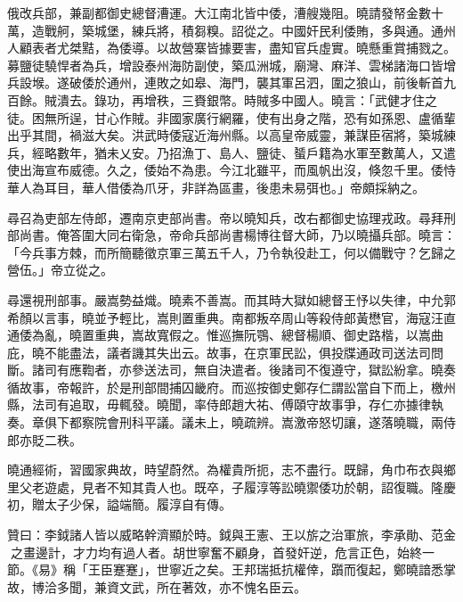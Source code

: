 \begin{pinyinscope}
俄改兵部，兼副都御史總督漕運。大江南北皆中倭，漕艘幾阻。曉請發帑金數十萬，造戰舸，築城堡，練兵將，積芻糗。詔從之。中國奸民利倭賄，多與通。通州人顧表者尤桀黠，為倭導。以故營寨皆據要害，盡知官兵虛實。曉懸重賞捕戮之。募鹽徒驍悍者為兵，增設泰州海防副使，築瓜洲城，廟灣、麻洋、雲梯諸海口皆增兵設堠。遂破倭於通州，連敗之如皋、海門，襲其軍呂泗，圍之狼山，前後斬首九百餘。賊潰去。錄功，再增秩，三賚銀幣。時賊多中國人。曉言：「武健才住之徒。困無所逞，甘心作賊。非國家廣行網羅，使有出身之階，恐有如孫恩、盧循輩出乎其間，禍滋大矣。洪武時倭寇近海州縣。以高皇帝威靈，兼謀臣宿將，築城練兵，經略數年，猶未乂安。乃招漁丁、島人、鹽徒、蜑戶籍為水軍至數萬人，又遣使出海宣布威德。久之，倭始不為患。今江北雖平，而風帆出沒，倏忽千里。倭恃華人為耳目，華人借倭為爪牙，非詳為區畫，後患未易弭也。」帝頗採納之。

尋召為吏部左侍郎，遷南京吏部尚書。帝以曉知兵，改右都御史協理戎政。尋拜刑部尚書。俺答圍大同右衛急，帝命兵部尚書楊博往督大師，乃以曉攝兵部。曉言：「今兵事方棘，而所簡聽徵京軍三萬五千人，乃令執役赴工，何以備戰守？乞歸之營伍。」帝立從之。

尋還視刑部事。嚴嵩勢益熾。曉素不善嵩。而其時大獄如總督王忬以失律，中允郭希顏以言事，曉並予輕比，嵩則置重典。南都叛卒周山等殺侍郎黃懋官，海寇汪直通倭為亂，曉置重典，嵩故寬假之。惟巡撫阮鶚、總督楊順、御史路楷，以嵩曲庇，曉不能盡法，議者譏其失出云。故事，在京軍民訟，俱投牒通政司送法司問斷。諸司有應鞫者，亦參送法司，無自決遣者。後諸司不復遵守，獄訟紛拿。曉奏循故事，帝報許，於是刑部間捕囚畿府。而巡按御史鄭存仁謂訟當自下而上，檄州縣，法司有追取，毋輒發。曉聞，率侍郎趙大祐、傅頤守故事爭，存仁亦據律執奏。章俱下都察院會刑科平議。議未上，曉疏辨。嵩激帝怒切讓，遂落曉職，兩侍郎亦貶二秩。

曉通經術，習國家典故，時望蔚然。為權貴所扼，志不盡行。既歸，角巾布衣與鄉里父老遊處，見者不知其貴人也。既卒，子履淳等訟曉禦倭功於朝，詔復職。隆慶初，贈太子少保，謚端簡。履淳自有傳。

贊曰：李鉞諸人皆以威略幹濟顯於時。鉞與王憲、王以旂之治軍旅，李承勛、范金之畫邊計，才力均有過人者。胡世寧奮不顧身，首發奸逆，危言正色，始終一節。《易》稱「王臣蹇蹇」，世寧近之矣。王邦瑞抵抗權倖，躓而復起，鄭曉諳悉掌故，博洽多聞，兼資文武，所在著效，亦不愧名臣云。


\end{pinyinscope}